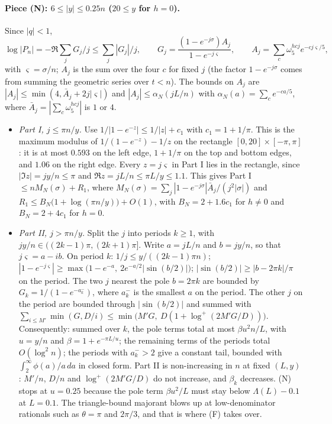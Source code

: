 \paragraph{Piece (N): $6\le|y|\le0.25n$ ($20\le y$ for $h=0$).} Since $|q|<1$,
\[
\log|P_n|=-\Re\sum_jG_j/j\le\sum_j|G_j|/j,\qquad G_j=\frac{(1-e^{-j\sigma})A_j}{1-e^{-j\varsigma}},\qquad
A_j=\sum_c\omega_5^{hcj}e^{-cj\varsigma/5},
\]
with $\varsigma=\sigma/n$; $A_j$ is the sum over the four $c$ for fixed $j$ (the factor $1-e^{-j\sigma}$ comes from summing
the geometric series over $t<n$). The bounds on $A_j$ are $|A_j|\le\min(4,\bar A_j+2j|\varsigma|)$ and
$|A_j|\le\alpha_N(jL/n)$ with $\alpha_N(a)=\sum_ce^{-ca/5}$, where $\bar A_j=|\sum_c\omega_5^{hcj}|$ is $1$ or $4$.
\begin{itemize}
\item \emph{Part I, $j\le\pi n/y$.} Use $1/|1-e^{-z}|\le1/|z|+c_1$ with $c_1=1+1/\pi$. This is the maximum modulus of
$1/(1-e^{-z})-1/z$ on the rectangle $[0,20]\times[-\pi,\pi]$: it is at most $0.593$ on the left edge, $1+1/\pi$ on the top
and bottom edges, and $1.06$ on the right edge. Every $z=j\varsigma$ in Part I lies in the rectangle, since
$|\Im z|=jy/n\le\pi$ and $\Re z=jL/n\le\pi L/y\le1.1$. This gives Part I $\le nM_N(\sigma)+R_1$, where
$M_N(\sigma)=\sum_j|1-e^{-j\sigma}|\bar A_j/(j^2|\sigma|)$ and $R_1\le B_N\big(1+\log(\pi n/y)\big)+O(1)$, with
$B_N=2+1.6c_1$ for $h\ne0$ and $B_N=2+4c_1$ for $h=0$.
\item \emph{Part II, $j>\pi n/y$.} Split the $j$ into periods $k\ge1$, with $jy/n\in((2k-1)\pi,(2k+1)\pi]$. Write
$a=jL/n$ and $b=jy/n$, so that $j\varsigma=a-ib$. On period $k$: $1/j\le y/((2k-1)\pi n)$;
$|1-e^{-j\varsigma}|\ge\max\big(1-e^{-a},\ 2e^{-a/2}|\sin(b/2)|\big)$; $|\sin(b/2)|\ge|b-2\pi k|/\pi$ on the period. The two
$j$ nearest the pole $b=2\pi k$ are bounded by $G_k=1/(1-e^{-a_k^-})$, where $a_k^-$ is the smallest $a$ on the period. The
other $j$ on the period are bounded through $|\sin(b/2)|$ and summed with
$\sum_{i\le M'}\min(G,D/i)\le\min\big(M'G,\ D(1+\log^+(2M'G/D))\big)$. Consequently: summed over $k$, the pole terms total
at most $\beta u^2n/L$, with $u=y/n$ and $\beta=1+e^{-\pi L/u}$; the remaining terms of the periods total $O(\log^2n)$; the
periods with $a_k^->2$ give a constant tail, bounded with $\int_2^\infty\phi(a)/a\,da$ in closed form. Part II is
non-increasing in $n$ at fixed $(L,y)$: $M'/n$, $D/n$ and $\log^+(2M'G/D)$ do not increase, and $\beta_k$ decreases. (N)
stops at $u=0.25$ because the pole term $\beta u^2/L$ must stay below $\Lambda(L)-0.1$ at $L=0.1$. The triangle-bound
majorant blows up at low-denominator rationals such as $\theta=\pi$ and $2\pi/3$, and that is where (F) takes over.
\end{itemize}
